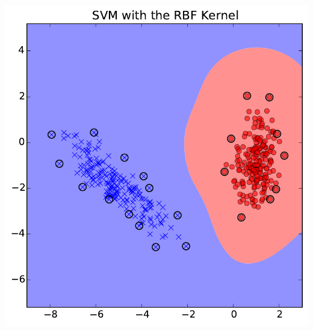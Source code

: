 \documentclass[10pt, aspectratio=169]{beamer} %
\begin{document}
\begin{frame}[fragile,allowframebreaks=0.8]
\begin{columns}[onlytextwidth]
\includegraphics[width=\columnwidth]{SVM_boundary_RBF.pdf}
\end{columns}
\end{frame}
\end{document}

